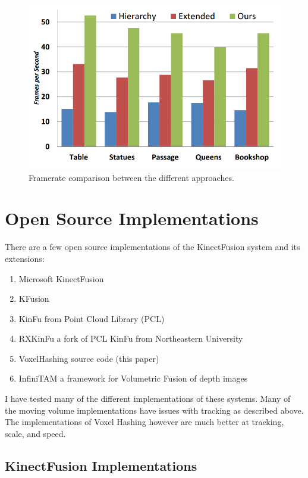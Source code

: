 \documentclass[10pt, twocolumn]{article}
\begin{document}
\begin{figure}
  \centering
  \includegraphics[width=1.0\linewidth]{results}
  \caption{Framerate comparison between the different approaches.}
  \label{fig:framerate}
\end{figure}


\section{Open Source Implementations} \label{sec:opensource}
There are a few open source implementations of the KinectFusion system and its
extensions:
\begin{enumerate}
  \item Microsoft KinectFusion \cite{MSKinectFusion}
  \item KFusion \cite{kfusion}
  \item KinFu from Point Cloud Library (PCL) \cite{kinfu}
  \item RXKinFu a fork of PCL KinFu from Northeastern University \cite{RXKinFu}
  \item VoxelHashing source code (this paper) \cite{voxelhashing}
  \item InfiniTAM a framework for Volumetric Fusion of depth images \cite{prisacariu2014}
\end{enumerate}

 I have tested many of the different implementations of these systems. 
Many of the moving volume implementations have issues with tracking as
 described above. The implementations of Voxel Hashing however are much better
 at tracking, scale, and speed.

\subsection{KinectFusion Implementations}
\end{document}
